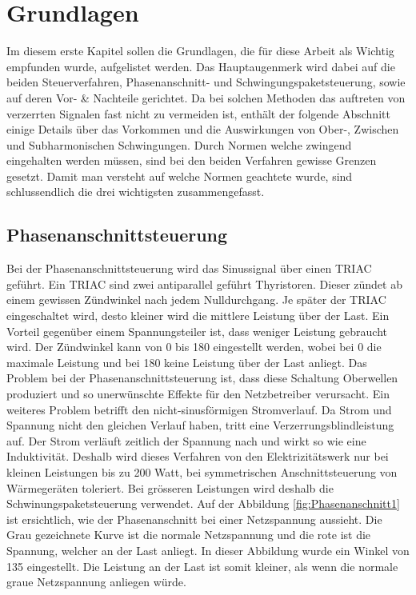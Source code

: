 

\section{Grundlagen}
Im diesem erste Kapitel sollen die Grundlagen, die für diese Arbeit als Wichtig empfunden wurde, aufgelistet werden. Das Hauptaugenmerk wird dabei auf die beiden Steuerverfahren, Phasenanschnitt- und Schwingungspaketsteuerung, sowie auf deren Vor- \& Nachteile gerichtet. Da bei solchen Methoden das auftreten von verzerrten Signalen fast nicht zu vermeiden ist, enthält der folgende Abschnitt einige Details über das Vorkommen und die Auswirkungen von Ober-, Zwischen und Subharmonischen Schwingungen. Durch Normen welche zwingend eingehalten werden müssen, sind bei den beiden Verfahren gewisse Grenzen gesetzt. Damit man versteht auf welche Normen geachtete wurde, sind schlussendlich die drei wichtigsten zusammengefasst.      


\subsection{Phasenanschnittsteuerung}
Bei der Phasenanschnittsteuerung wird das Sinussignal über einen TRIAC geführt. Ein TRIAC sind zwei antiparallel geführt Thyristoren. Dieser zündet ab einem gewissen Zündwinkel nach jedem Nulldurchgang. Je später der TRIAC eingeschaltet wird, desto kleiner wird die mittlere Leistung über der Last. Ein Vorteil gegenüber einem Spannungsteiler ist, dass weniger Leistung gebraucht wird. Der Zündwinkel kann von 0\textdegree \hspace{0.02cm} bis 180\textdegree \hspace{0.02cm} eingestellt werden, wobei bei 0\textdegree \hspace{0.02cm} die maximale Leistung und bei 180\textdegree \hspace{0.02cm} keine Leistung über der Last anliegt. Das Problem bei der Phasenanschnittsteuerung ist, dass diese Schaltung Oberwellen produziert und so unerwünschte Effekte für den Netzbetreiber verursacht. Ein weiteres Problem betrifft den nicht-sinusförmigen Stromverlauf. Da Strom und Spannung nicht den gleichen Verlauf haben, tritt eine Verzerrungsblindleistung auf. Der Strom verläuft zeitlich der Spannung nach und wirkt so wie eine Induktivität. Deshalb wird dieses Verfahren von den Elektrizitätswerk nur bei kleinen Leistungen bis zu 200 Watt, bei symmetrischen Anschnittsteuerung von Wärmegeräten toleriert. Bei grösseren Leistungen wird deshalb die Schwinungspaketsteuerung verwendet. Auf der Abbildung \ref{fig:Phasenanschnitt1} ist ersichtlich, wie der Phasenanschnitt bei einer Netzspannung aussieht. Die Grau gezeichnete Kurve ist die normale Netzspannung und die rote ist die Spannung, welcher an der Last anliegt. In dieser Abbildung wurde ein Winkel von 135\textdegree \hspace{0.02cm} eingestellt. Die Leistung an der Last ist somit kleiner, als wenn die normale graue Netzspannung anliegen würde. 

